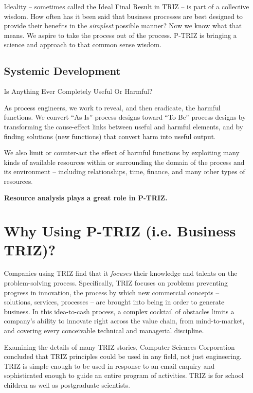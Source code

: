 \documentclass[11pt,a4paper]{article}
\begin{document}
Ideality – sometimes called the Ideal Final Result in TRIZ – is part of a
collective wisdom. How often has it been said that business processes are best
designed to provide their benefits in the \emph{simplest} possible manner? Now
we know what that means. We aspire to take the process out of the process.
P-TRIZ is bringing a science and approach to that common sense wisdom.

\subsection{Systemic Development}

Is Anything Ever Completely Useful Or Harmful?

As process engineers, we work to reveal, and then eradicate, the harmful
functions. We convert “As Is” process designs toward “To Be” process designs
by transforming the cause-effect links between useful and harmful elements,
and by finding solutions (new functions) that convert harm into useful output.

We also limit or counter-act the effect of harmful functions by exploiting
many kinds of available resources within or surrounding the domain of the
process and its environment – including relationships, time, finance, and many
other types of resources.

\textbf{Resource analysis plays a great role in P-TRIZ.}

\section{Why Using P-TRIZ (i.e. Business TRIZ)?}

Companies using TRIZ find that it \emph{focuses} their knowledge and talents
on the problem-solving process. Specifically, TRIZ focuses on problems
preventing progress in innovation, the process by which new commercial
concepts – solutions, services, processes – are brought into being in order to
generate business. In this idea-to-cash process, a complex cocktail of
obstacles limits a company’s ability to innovate right across the value chain,
from mind-to-market, and covering every conceivable technical and managerial
discipline.

Examining the details of many TRIZ stories, Computer Sciences Corporation
concluded that TRIZ principles could be used in any field, not just
engineering. TRIZ is simple enough to be used in response to an email enquiry
and sophisticated enough to guide an entire program of activities.  TRIZ is
for school children as well as postgraduate scientists.
\end{document}
